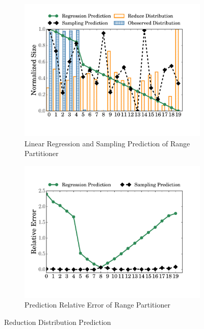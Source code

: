 \begin{figure}
	\begin{subfigure}[b]{0.5\linewidth}
		\includegraphics[width=\linewidth]{fig/range_pre_sample}
		\caption{Linear Regression and Sampling Prediction of Range Partitioner}
		\label{fig:range_pre_sample}
	\end{subfigure}
	\begin{subfigure}[b]{0.49\linewidth}
		\includegraphics[width=\linewidth]{fig/prediction_relative_error}
		\caption{Prediction Relative Error of Range Partitioner\newline}
		\label{fig:prediction_relative_error}
	\end{subfigure}
	\caption{Reduction Distribution Prediction}
	\label{fig:dis}
\end{figure}

